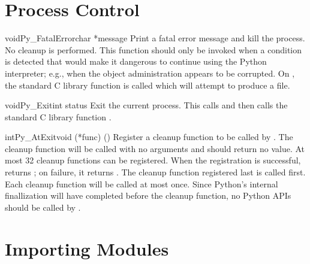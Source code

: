 \documentclass{manual}
\begin{document}
\section{Process Control \label{processControl}}

\begin{cfuncdesc}{void}{Py_FatalError}{char *message}
Print a fatal error message and kill the process.  No cleanup is
performed.  This function should only be invoked when a condition is
detected that would make it dangerous to continue using the Python
interpreter; e.g., when the object administration appears to be
corrupted.  On \UNIX{}, the standard C library function
 is called which will attempt to
produce a  file.
\end{cfuncdesc}

\begin{cfuncdesc}{void}{Py_Exit}{int status}
Exit the current process.  This calls
 and
then calls the standard C library function
.
\end{cfuncdesc}

\begin{cfuncdesc}{int}{Py_AtExit}{void (*func) ()}
Register a cleanup function to be called by
.
The cleanup function will be called with no arguments and should
return no value.  At most 32 cleanup
functions can be registered.
When the registration is successful,  returns
; on failure, it returns .  The cleanup function
registered last is called first.  Each cleanup function will be called
at most once.  Since Python's internal finallization will have
completed before the cleanup function, no Python APIs should be called
by .
\end{cfuncdesc}


\section{Importing Modules \label{importing}}
\end{document}
